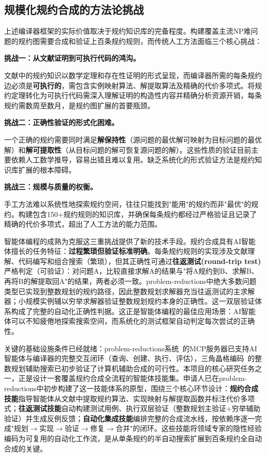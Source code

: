 \subsection{规模化规约合成的方法论挑战}

上述编译器框架的实际价值取决于规约知识库的完备程度。构建覆盖主流NP难问题的规约图需要合成和验证上百条规约规则，而传统人工方法面临三个核心挑战：

\textbf{挑战一：从文献证明到可执行代码的鸿沟。}

文献中的规约知识以数学定理和存在性证明的形式呈现，而编译器所需的每条规约边必须是\textbf{可执行的}，需包含实例映射算法、解提取算法及精确的代价多项式。将规约定理转化为可执行代码需深入理解证明的构造性内容并精确分析资源开销，每条规约需数周至数月，是规约图扩展的首要瓶颈。

\textbf{挑战二：正确性验证的形式化困难。}

一个正确的规约需要同时满足\textbf{解保持性}（源问题的最优解可映射为目标问题的最优解）和\textbf{解可提取性}（从目标问题的解可恢复源问题的解）。这些性质的验证目前主要依赖人工数学推导，容易出错且难以复用。缺乏系统化的形式验证方法是规约知识库扩展的根本障碍。

\textbf{挑战三：规模与质量的权衡。}

手工方法难以系统性地探索规约空间，往往只能找到"能用"的规约而非"最优"的规约。构建包含150+规约规则的知识库，并确保每条规约都经过严格验证且记录了精确的代价多项式，超出了人工方法的能力范围。

智能体编程的成熟为克服这三重挑战提供了新的技术手段。规约合成具有AI智能体擅长的任务特征：\textbf{过程繁琐但验证标准明确}。每条规约规则的实现涉及文献理解、代码编写和组合搜索（繁琐），但其正确性可通过\textbf{往返测试(round-trip test)}严格判定（可验证）：对问题A，比较直接求解A的结果与"将A规约到B、求解B、再将B的解提取回A"的结果，两者必须一致。problem-reductions中绝大多数问题类型已实现到整数规划的规约路径，因此整数规划求解器充当往返测试的主求解器；小规模实例辅以穷举求解器验证整数规划规约本身的正确性。这一双层验证体系构成了完整的自动化正确性判据。这正是智能体编程的最佳应用场景：AI智能体可以不知疲倦地探索搜索空间，而系统化的测试框架自动判定每次尝试的正确性。

关键的基础设施条件已经就绪：problem-reductions系统~\cite{ProblemReductions2025}的MCP服务器已支持AI智能体与编译器的完整交互闭环（查询、创建、执行、评估），三角晶格编码~\cite{Pan2025Triangular}的整数规划辅助搜索已初步验证了计算机辅助合成的可行性。本项目的核心研究任务之一，正是设计一套覆盖规约合成全流程的智能体技能集。申请人已在problem-reductions中初步构建了这一技能体系的原型，围绕三个核心环节设计：\textbf{规约合成技能}指导智能体从文献中提取规约算法、实现映射与解提取函数并标注代价多项式；\textbf{往返测试技能}自动构建测试用例、执行双层验证（整数规划主验证+穷举辅助验证）并生成反例反馈；\textbf{自动化集成技能}编排完整的合成流水线，按依赖序逐一完成"规划$\to$实现$\to$验证$\to$修复$\to$合并"的闭环。这些技能将领域专家的隐性经验编码为可复用的自动化工作流，是从单条规约的半自动搜索扩展到百条规约全自动合成的关键。


